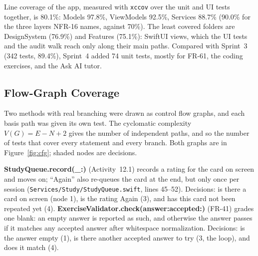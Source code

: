 \documentclass[12pt,letterpaper]{article}
\begin{document}
Line coverage of the app, measured with \texttt{xccov} over the unit and UI tests
together, is 80.1\%: Models 97.8\%, ViewModels 92.5\%, Services 88.7\% (90.0\% for
the three layers NFR-16 names, against 70\%). The least covered folders are
DesignSystem (76.9\%) and Features (75.1\%): SwiftUI views, which the UI tests and
the audit walk reach only along their main paths. Compared with Sprint~3 (342 tests,
89.4\%), Sprint~4 added 74 unit tests, mostly for FR-61, the coding exercises, and
the Ask AI tutor.

\subsection{Flow-Graph Coverage}\label{sec:flowgraph}
Two methods with real branching were drawn as control flow graphs, and each basis
path was given its own test. The cyclomatic complexity $V(G) = E - N + 2$ gives the
number of independent paths, and so the number of tests that cover every statement
and every branch. Both graphs are in Figure~\ref{fig:cfg}; shaded nodes are
decisions.

\textbf{StudyQueue.record(\_:)} (Activity~12.1) records a rating for the card on
screen and moves on; ``Again'' also re-queues the card at the end, but only once per
session (\texttt{Services/Study/StudyQueue.swift}, lines 45--52). Decisions: is there
a card on screen (node 1), is the rating Again (3), and has this card not been
repeated yet (4). \textbf{ExerciseValidator.check(answer:accepted:)} (FR-41) grades
one blank: an empty answer is reported as such, and otherwise the answer passes if it
matches any accepted answer after whitespace normalization. Decisions: is the answer
empty (1), is there another accepted answer to try (3, the loop), and does it match
(4).
\end{document}
